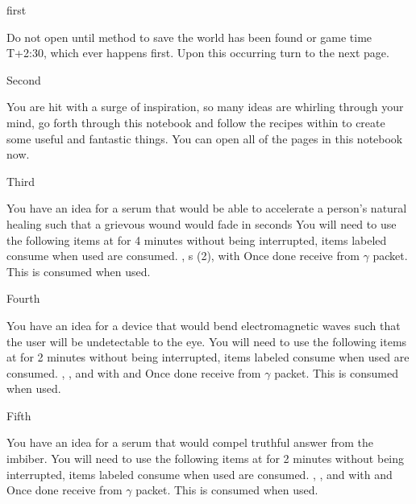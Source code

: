 \documentclass[greennotebook]{guildcamp3} %
\begin{document}
\startnotebook{\nSciOneRecipes{}}

\begin{page}{first}
	
	Do not open until method to save the world has been found or game time T+2:30, which ever happens first. Upon this occurring turn to the next page.
	
\end{page}

\begin{page}{Second}
	
	You are hit with a surge of inspiration, so many ideas are whirling through your mind, go forth through this notebook and follow the recipes within to create some useful and fantastic things. You can open all of the pages in this notebook now.
	
\end{page}

\begin{page}{Third}
	
	You have an idea for a serum that would be able to accelerate a person's natural healing such that a grievous wound would fade in seconds
	You will need to use the following items at \sSciWorkbench{} for 4 minutes without being interrupted, items labeled consume when used are consumed.
		\iPenicillin{}, \iTransistor{}s (2), \iFlashlight{} with \iScrewdriver{}
	Once done receive \iHealthRemedy{} from $\gamma$ packet. This is consumed when used. 
	
\end{page}

\begin{page}{Fourth}
	
	You have an idea for a device that would bend electromagnetic waves such that the user will be undetectable to the eye.
	You will need to use the following items at \sSciWorkbench{} for 2 minutes without being interrupted, items labeled consume when used are consumed.
	\iCircuitBoard{}, \iNiobiumCarbide{}, and \iTransistor{} with \iDiamondDrill{} and \iMultitool{}
	Once done receive \iCloakingDevice{} from $\gamma$ packet. This is consumed when used. 
	
\end{page}

\begin{page}{Fifth}
	
	You have an idea for a serum that would compel truthful answer from the imbiber.
	You will need to use the following items at \sSciWorkbench{} for 2 minutes without being interrupted, items labeled consume when used are consumed.
	\iCompoundNine{}, \iBloodPlasma{}, and \iOil{} with \iCentrifuge{} and \iTestTube{}
	Once done receive \iTruthSerum{} from $\gamma$ packet. This is consumed when used. 
	
\end{page}
\end{document}
